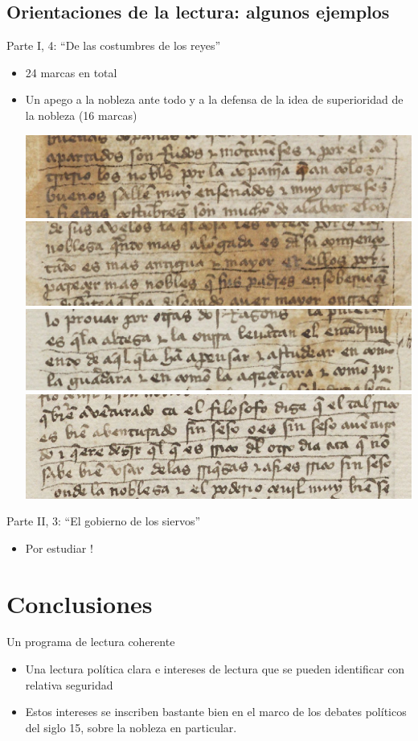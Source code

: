 \documentclass[11pt,aspectratio=169]{beamer}
\begin{document}
\subsection{Orientaciones de la lectura: algunos ejemplos}
\begin{frame}{Parte I, 4: \enquote{De las costumbres de los reyes}}
\begin{itemize}
\item 24 marcas en total
\item Un apego a la nobleza ante todo y a la defensa de la idea de superioridad de la nobleza (16 marcas)
\begin{center}
\includegraphics[width=.4\textwidth]{../results/kraken_transcription_results/pg_0112_0.png}
\includegraphics[width=.4\textwidth]{../results/kraken_transcription_results/pg_0112_1.png}
\includegraphics[width=.4\textwidth]{../results/kraken_transcription_results/pg_0113_1.png}
\includegraphics[width=.4\textwidth]{../results/kraken_transcription_results/pg_0116_0.png}\end{center}
\end{itemize}
\end{frame}

\begin{frame}{Parte II, 3: \enquote{El gobierno de los siervos}}
\begin{itemize}
\item Por estudiar !
\end{itemize}
\end{frame}



\section{Conclusiones}

\begin{frame}{Un programa de lectura coherente}
\begin{center}
\begin{itemize}
\item Una lectura política clara e intereses de lectura que se pueden identificar con relativa seguridad
\item Estos intereses se inscriben bastante bien en el marco de los debates políticos del siglo 15, sobre la nobleza en particular.
\end{itemize}
\end{center}
\end{frame}
\end{document}
